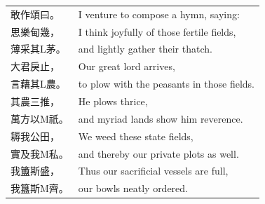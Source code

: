 \begin{longtable}{p{} p{}}









敢作頌曰。 &
I venture to compose a hymn, saying:\\

思樂甸幾， &
I think joyfully of those fertile fields,\\

薄采其L茅。
&
and lightly gather their thatch.\\

大君戾止， &
Our great lord arrives,\\

言藉其L農。
&
to plow with the peasants in those fields.\\

其農三推， &
He plows thrice,\\

萬方以M祇。
&
and myriad lands show him reverence.\\

耨我公田， &
We weed these state fields,\\

實及我M私。
&
and thereby our private plots as well.\\

我簠斯盛， &
Thus our sacrificial vessels are full,\\

我簋斯M齊。
&
our bowls neatly ordered.\\


\end{longtable}
